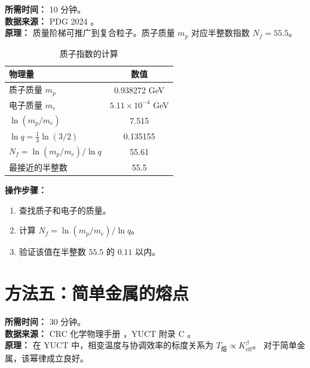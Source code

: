 \documentclass[12pt,a4paper]{article}
\newcommand{\Ke}{K_{\mathrm{eff}}}
\begin{document}
	\textbf{所需时间：} 10 分钟。\\
	\textbf{数据来源：} PDG 2024 \cite{PDG2024}。\\
	\textbf{原理：} 质量阶梯可推广到复合粒子。质子质量 \(m_p\) 对应半整数指数 \(N_f = 55.5\)。
	
	\begin{table}[H]
		\centering
		\caption{质子指数的计算}
		\label{tab:proton}
		\begin{tabular}{l c}
			\toprule
			物理量 & 数值 \\
			\midrule
			质子质量 \(m_p\) & 0.938272 GeV \\
			电子质量 \(m_e\) & \(5.11\times10^{-4}\) GeV \\
			\(\ln(m_p/m_e)\) & 7.515 \\
			\(\ln q = \frac{1}{3}\ln(3/2)\) & 0.135155 \\
			\(N_f = \ln(m_p/m_e)/\ln q\) & 55.61 \\
			最接近的半整数 & 55.5 \\
			\bottomrule
		\end{tabular}
	\end{table}
	
	\textbf{操作步骤：}
	\begin{enumerate}[label=(\arabic*)]
		\item 查找质子和电子的质量。
		\item 计算 \(N_f = \ln(m_p / m_e) / \ln q\)。
		\item 验证该值在半整数 \(55.5\) 的 \(0.11\) 以内。
	\end{enumerate}
	
	\section{方法五：简单金属的熔点}
	\label{sec:melting}
	
	\textbf{所需时间：} 30 分钟。\\
	\textbf{数据来源：} CRC 化学物理手册 \cite{CRC}，YUCT 附录 C \cite{AppendixC}。\\
	\textbf{原理：} 在 YUCT 中，相变温度与协调效率的标度关系为 \(T_{\text{熔}} \propto \Ke^{\beta}\)。
	对于简单金属，该幂律成立良好。
	
\end{document}
